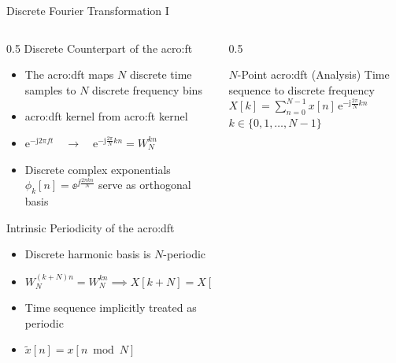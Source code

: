 \begin{frame}{Discrete Fourier Transformation I}
  \begin{columns}[T,onlytextwidth]
    \begin{column}{0.5\textwidth}
      Discrete Counterpart of the \gls{acro:ft}\\
      \begin{itemize}
        \item The \gls{acro:dft} maps $N$ discrete time samples to $N$ discrete frequency bins
        \item \Gls{acro:dft} kernel from \gls{acro:ft} kernel
        \item $\mathrm{e}^{-\mathrm{j} 2\pi f t} \quad\longrightarrow\quad \mathrm{e}^{-\mathrm{j} \frac{2\pi}{N} k n} = W_N^{k n}$
        \item Discrete complex exponentials $\phi_k[n] = \ee^{\jj \frac{2 \pi k n}{N}}$ serve as orthogonal basis
      \end{itemize}
      Intrinsic Periodicity of the \gls{acro:dft}
      \begin{itemize}
        \item Discrete harmonic basis is $N$-periodic
        \item $W_N^{(k + N)n} = W_N^{kn} \implies X[k + N] = X[k]$
        \item Time sequence implicitly treated as periodic
        \item $\tilde{x}[n] = x[n \bmod N]$
      \end{itemize}
    \end{column}

    \begin{column}{0.5\textwidth}
      \begin{block}{$N$-Point \gls{acro:dft} (Analysis)}
        Time sequence to discrete frequency\\
        \vspace{0.4em}
        \centering
        $X[k] = \sum_{n=0}^{N-1} x[n] \,\mathrm{e}^{-\mathrm{j} \frac{2\pi}{N} k n}$ \\[0.2cm]
        \footnotesize $k \in \{0, 1, \dots, N-1\}$
      \end{block}


\end{column}
\end{columns}
\end{frame}
